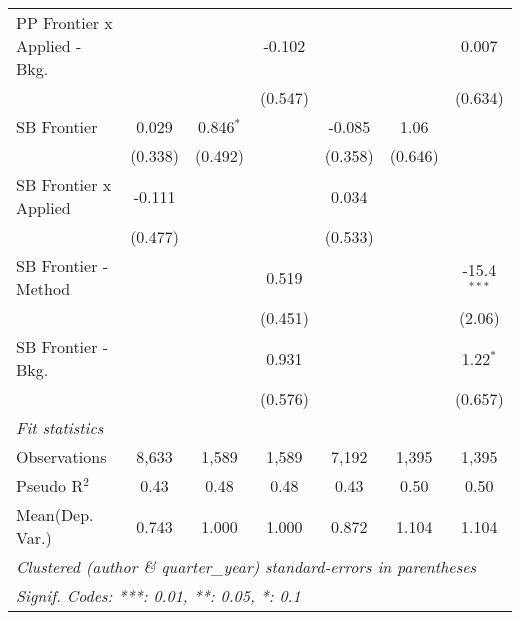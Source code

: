 \begin{tabular}{lcccccc}
   PP Frontier x Applied - Bkg.   &                &                & -0.102         &                &                & 0.007\\   
                                  &                &                & (0.547)        &                &                & (0.634)\\   
   SB Frontier                    & 0.029          & 0.846$^{*}$    &                & -0.085         & 1.06           &   \\   
                                  & (0.338)        & (0.492)        &                & (0.358)        & (0.646)        &   \\   
   SB Frontier x Applied          & -0.111         &                &                & 0.034          &                &   \\   
                                  & (0.477)        &                &                & (0.533)        &                &   \\   
   SB Frontier - Method           &                &                & 0.519          &                &                & -15.4$^{***}$\\   
                                  &                &                & (0.451)        &                &                & (2.06)\\   
   SB Frontier - Bkg.             &                &                & 0.931          &                &                & 1.22$^{*}$\\   
                                  &                &                & (0.576)        &                &                & (0.657)\\   
   \midrule
   \emph{Fit statistics}\\
   Observations                   & 8,633          & 1,589          & 1,589          & 7,192          & 1,395          & 1,395\\  
   Pseudo R$^2$                   & 0.43           & 0.48           & 0.48           & 0.43           & 0.50           & 0.50\\  
Mean(Dep. Var.) & 0.743 & 1.000 & 1.000 & 0.872 & 1.104 & 1.104 \\
   \midrule \midrule
   \multicolumn{7}{l}{\emph{Clustered (author \& quarter\_year) standard-errors in parentheses}}\\
   \multicolumn{7}{l}{\emph{Signif. Codes: ***: 0.01, **: 0.05, *: 0.1}}\\
\end{tabular}
\par\endgroup
